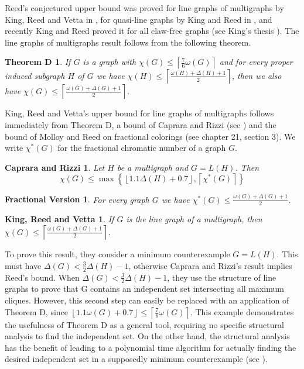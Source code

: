 \documentclass[12pt]{article}
\theoremstyle{plain}
\newtheorem*{CapRizz}{Caprara and Rizzi}
\newtheorem*{FractionalTheorem}{Fractional Version}
\newtheorem*{KingVettaReed}{King, Reed and Vetta}
\newtheorem*{TheoremD}{Theorem D}
\theoremstyle{definition}
\theoremstyle{remark}
\begin{document}
Reed's conjectured upper bound was proved for line graphs of multigraphs by King, Reed and Vetta in \cite{LineGraphs}, for quasi-line graphs by King and Reed in \cite{QuasiLineGraphs}, and recently King and Reed proved it for all claw-free graphs (see King's thesis \cite{KingThesis}).  The line graphs of multigraphs result follows from the following theorem.\newline

\begin{TheoremD}
If $G$ is a graph with $\chi(G) \leq \left\lceil \frac{7}{6}\omega(G) \right\rceil$ and for every proper induced subgraph $H$ of $G$ we have $\chi(H) \leq \left\lceil \frac{\omega(H) + \Delta(H) + 1}{2}\right\rceil$, then we also have $\chi(G) \leq \left\lceil \frac{\omega(G) + \Delta(G) + 1}{2}\right\rceil$.
\end{TheoremD}

King, Reed and Vetta's upper bound for line graphs of multigraphs follows immediately from Theorem D, a bound of Caprara and Rizzi (see \cite{CapraraAndRizzi}) and the bound of Molloy and Reed on fractional colorings (see \cite{MolloyAndReed} chapter 21, section 3). 
We write $\chi^*(G)$ for the fractional chromatic number of a graph $G$.

\begin{CapRizz}
Let $H$ be a multigraph and $G = L(H)$.  Then
\[\chi(G) \leq \max\left\{\left\lfloor 1.1\Delta(H) + 0.7 \right\rfloor, \left\lceil \chi^*(G) \right\rceil\right\}\]
\end{CapRizz}

\begin{FractionalTheorem}
For every graph $G$ we have $\chi^*(G) \leq \frac{\omega(G) + \Delta(G) + 1}{2}$.
\end{FractionalTheorem}

\begin{KingVettaReed}
If $G$ is the line graph of a multigraph, then $\chi(G) \leq \left\lceil \frac{\omega(G) + \Delta(G) + 1}{2}\right\rceil$.
\end{KingVettaReed}

To prove this result, they consider a minimum counterexample $G = L(H)$. This must have $\Delta(G) < \frac{3}{2}\Delta(H) - 1$, otherwise Caprara and Rizzi's result implies Reed's bound.
When $\Delta(G) < \frac{3}{2}\Delta(H) - 1$, they use the structure of line graphs to prove that G contains an independent set intersecting all maximum cliques. However, this second step can easily be replaced with an application of Theorem D, since $\left\lfloor 1.1 \omega(G) + 0.7 \right\rfloor \leq \left\lceil \frac{7}{6}\omega(G) \right\rceil$. This example
demonstrates the usefulness of Theorem D as a general tool, requiring no specific structural analysis to find the independent set. On the other hand, the structural analysis has the benefit of leading to a polynomial time algorithm for actually finding the desired independent set in a supposedly minimum counterexample (see \cite{LineGraphs}).
\end{document}
